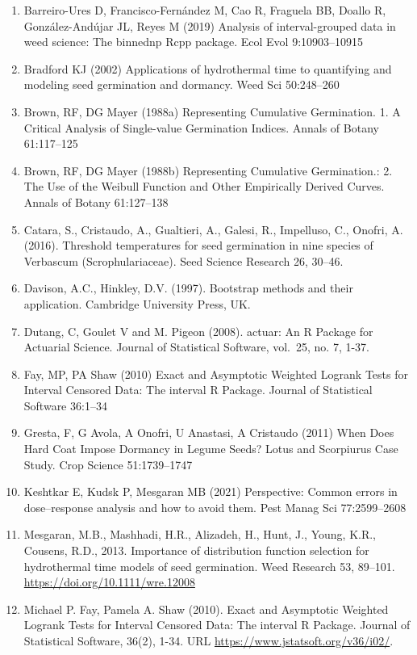 \documentclass[
]{book}
\providecommand{\tightlist}{%
  \setlength{\itemsep}{0pt}\setlength{\parskip}{0pt}}
\begin{document}
\begin{enumerate}
\def\labelenumi{\arabic{enumi}.}
\tightlist
\item
  Barreiro-Ures D, Francisco-Fernández M, Cao R, Fraguela BB, Doallo R, González-Andújar JL, Reyes M (2019) Analysis of interval-grouped data in weed science: The binnednp Rcpp package. Ecol Evol 9:10903--10915
\item
  Bradford KJ (2002) Applications of hydrothermal time to quantifying and modeling seed germination and dormancy. Weed Sci 50:248--260
\item
  Brown, RF, DG Mayer (1988a) Representing Cumulative Germination. 1. A Critical Analysis of Single-value Germination Indices. Annals of Botany 61:117--125
\item
  Brown, RF, DG Mayer (1988b) Representing Cumulative Germination.: 2. The Use of the Weibull Function and Other Empirically Derived Curves. Annals of Botany 61:127--138
\item
  Catara, S., Cristaudo, A., Gualtieri, A., Galesi, R., Impelluso, C., Onofri, A. (2016). Threshold temperatures for seed germination in nine species of Verbascum (Scrophulariaceae). Seed Science Research 26, 30--46.
\item
  Davison, A.C., Hinkley, D.V. (1997). Bootstrap methods and their application. Cambridge University Press, UK.
\item
  Dutang, C, Goulet V and M. Pigeon (2008). actuar: An R Package for Actuarial Science. Journal of Statistical Software, vol.~25, no. 7, 1-37.
\item
  Fay, MP, PA Shaw (2010) Exact and Asymptotic Weighted Logrank Tests for Interval Censored Data: The interval R Package. Journal of Statistical Software 36:1--34
\item
  Gresta, F, G Avola, A Onofri, U Anastasi, A Cristaudo (2011) When Does Hard Coat Impose Dormancy in Legume Seeds? Lotus and Scorpiurus Case Study. Crop Science 51:1739--1747
\item
  Keshtkar E, Kudsk P, Mesgaran MB (2021) Perspective: Common errors in dose--response analysis and how to avoid them. Pest Manag Sci 77:2599--2608
\item
  Mesgaran, M.B., Mashhadi, H.R., Alizadeh, H., Hunt, J., Young, K.R., Cousens, R.D., 2013. Importance of distribution function selection for hydrothermal time models of seed germination. Weed Research 53, 89--101. \url{https://doi.org/10.1111/wre.12008}
\item
  Michael P. Fay, Pamela A. Shaw (2010). Exact and Asymptotic Weighted Logrank Tests for Interval Censored Data: The interval R Package. Journal of Statistical Software, 36(2), 1-34. URL \url{https://www.jstatsoft.org/v36/i02/}.

\end{enumerate}
\end{document}
